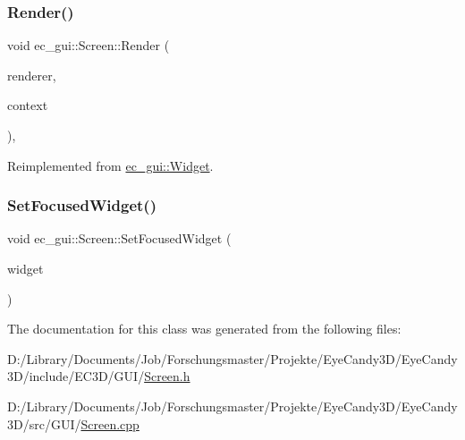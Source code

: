 \subsubsection{\texorpdfstring{Render()}{Render()}}
{\footnotesize\ttfamily void ec\+\_\+gui\+::\+Screen\+::\+Render (\begin{DoxyParamCaption}\item[{\mbox{\hyperlink{classec__gui_1_1_g_u_i_renderer}{G\+U\+I\+Renderer}} \&}]{renderer,  }\item[{\mbox{\hyperlink{classec__gui_1_1_g_u_i_rendering_context}{G\+U\+I\+Rendering\+Context}} \&}]{context }\end{DoxyParamCaption})\hspace{0.3cm}{\ttfamily [override]}, {\ttfamily [virtual]}}



Reimplemented from \mbox{\hyperlink{classec__gui_1_1_widget_a5a8b9275293ea433e6ba8fec3e7b5232}{ec\+\_\+gui\+::\+Widget}}.

\mbox{\label{classec__gui_1_1_screen_afad8f0e7494006c1c44953851dc8d9d4}} 
\subsubsection{\texorpdfstring{Set\+Focused\+Widget()}{SetFocusedWidget()}}
{\footnotesize\ttfamily void ec\+\_\+gui\+::\+Screen\+::\+Set\+Focused\+Widget (\begin{DoxyParamCaption}\item[{\mbox{\hyperlink{classec__gui_1_1_widget}{Widget}} $\ast$}]{widget }\end{DoxyParamCaption})}



The documentation for this class was generated from the following files\+:\begin{DoxyCompactItemize}
\item 
D\+:/\+Library/\+Documents/\+Job/\+Forschungsmaster/\+Projekte/\+Eye\+Candy3\+D/\+Eye\+Candy3\+D/include/\+E\+C3\+D/\+G\+U\+I/\mbox{\hyperlink{_screen_8h}{Screen.\+h}}\item 
D\+:/\+Library/\+Documents/\+Job/\+Forschungsmaster/\+Projekte/\+Eye\+Candy3\+D/\+Eye\+Candy3\+D/src/\+G\+U\+I/\mbox{\hyperlink{_screen_8cpp}{Screen.\+cpp}}\end{DoxyCompactItemize}
